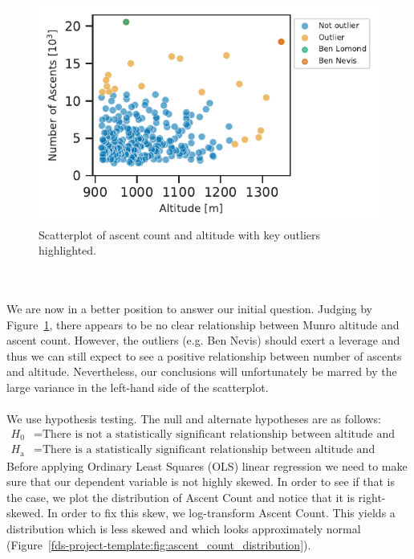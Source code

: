 \documentclass[11pt,a4paper]{article}
\begin{document}
\begin{figure} [h!]
  \centering
  \includegraphics{report/scatterplot.pdf}
  \caption{Scatterplot of ascent count and altitude with key outliers highlighted.}
  \label{fds-project-template:fig:scatterplot}
\end{figure}\\ \\
We are now in a better position to answer our initial question. Judging by Figure~\ref{fds-project-template:fig:scatterplot}, there appears to be no clear relationship between Munro altitude and ascent count. However, the outliers (e.g. Ben Nevis) should exert a leverage and thus we can still expect to see a positive relationship between number of ascents and altitude. Nevertheless, our conclusions will unfortunately be marred by the large variance in the left-hand side of the scatterplot. \\ \\
We use hypothesis testing. The null and alternate hypotheses are as follows:
\begin{align*}
    H_0 &= \text{There is not a statistically significant relationship between altitude and number of ascents.}\\
    H_\text{a} &= \text{There is a statistically significant relationship between altitude and number of ascents.}
\end{align*}
Before applying Ordinary Least Squares (OLS) linear regression we need to make sure that our dependent variable is not highly skewed. In order to see if that is the case, we plot the distribution of Ascent Count and notice that it is right-skewed. In order to fix this skew, we log-transform Ascent Count. This yields a distribution which is less skewed and which looks approximately normal (Figure~\ref{fds-project-template:fig:ascent_count_distribution}).
\end{document}
